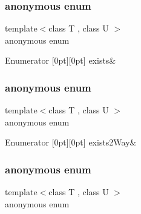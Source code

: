\subsubsection{\texorpdfstring{anonymous enum}{anonymous enum}}
{\footnotesize\ttfamily template$<$class T , class U $>$ \\
anonymous enum}

\begin{DoxyEnumFields}{Enumerator}
[0pt][0pt]{}\mbox{\label{structUtil_1_1Conversion_a0afeebd8eb1397aae8486da9e36def56a66cec7f52af17b9d2055795f332f3435}} 
exists&\\
\hline

\end{DoxyEnumFields}
\mbox{\label{structUtil_1_1Conversion_a44a91222a27c909d345366a6d7bdce87}} 
\subsubsection{\texorpdfstring{anonymous enum}{anonymous enum}}
{\footnotesize\ttfamily template$<$class T , class U $>$ \\
anonymous enum}

\begin{DoxyEnumFields}{Enumerator}
[0pt][0pt]{}\mbox{\label{structUtil_1_1Conversion_a95643f0bc1319702bcb44f0653b2cb07a57b873c1826056eca5f6fb7d56ccb11f}} 
exists2\+Way&\\
\hline

\end{DoxyEnumFields}
\mbox{\label{structUtil_1_1Conversion_a7744a2074e1793cc7f1de1799d3e1b01}} 
\subsubsection{\texorpdfstring{anonymous enum}{anonymous enum}}
{\footnotesize\ttfamily template$<$class T , class U $>$ \\
anonymous enum}

